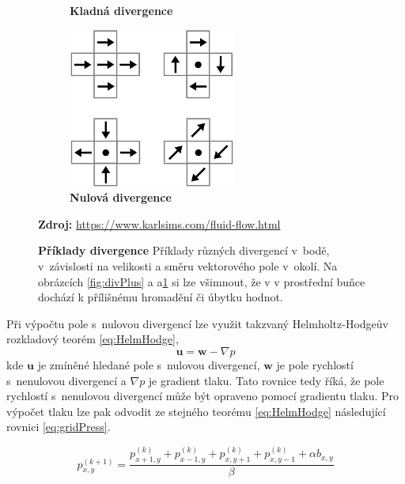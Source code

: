 \begin{figure}[h]
\begin{subfigure}{.3\textwidth}
		\caption{\textbf{Kladná divergence}}
		\label{fig:divNeg}
	\end{subfigure}
	\begin{subfigure}{.3\textwidth}
		\centering
		\includegraphics[width=0.8\linewidth]{obrazky-figures/div-zero.png}
		\caption{\textbf{Nulová divergence}}
		\label{fig:divZero}
	\end{subfigure}
	\caption{\textbf{Příklady divergence } Příklady různých divergencí v~bodě, v~závislosti na velikosti a směru vektorového pole v~okolí. Na obrázcích \ref{fig:divPlus} a a\ref{fig:divNeg} si lze všimnout, že v v prostřední buňce dochází k přílišnému hromadění či úbytku hodnot.}
	\textbf{Zdroj:} \url{https://www.karlsims.com/fluid-flow.html}
	\label{fig:div}
\end{figure}

Při výpočtu pole s~nulovou divergencí lze využit takzvaný Helmholtz-Hodgeův rozkladový teorém \ref{eq:HelmHodge},
\begin{equation}
	\mathbf{u} = \mathbf{w} - \nabla p
	\label{eq:HelmHodge}
\end{equation}
kde $\mathbf{u}$ je zmíněné hledané pole s~nulovou divergencí, $\mathbf{w}$ je pole rychlostí s~nenulovou divergencí a $\nabla p$ je gradient tlaku. Tato rovnice tedy říká, že pole rychlostí s~nenulovou divergencí může být opraveno pomocí gradientu tlaku. Pro výpočet tlaku lze pak odvodit ze stejného teorému \ref{eq:HelmHodge} následující rovnici \ref{eq:gridPress}. \cite{webglFluid}

\begin{equation}
	p_{x,y}^{(k+1)} = \frac{p_{x+1,y}^{(k)} + p_{x-1,y}^{(k)} + p_{x,y+1}^{(k)} + p_{x,y-1}^{(k)} + \alpha b_{x,y}}{\beta}
	\label{eq:gridPress}
\end{equation}

